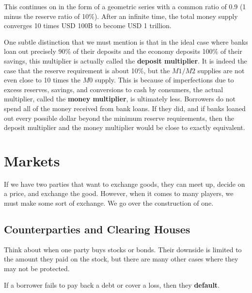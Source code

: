 \documentclass{article}
\begin{document}
      This continues on in the form of a geometric series with a common ratio of 0.9 (1 minus the reserve ratio of 10\%). After an infinite time, the total money supply converges 10 times USD 100B to become USD 1 trillion.

      One subtle distinction that we must mention is that in the ideal case where banks loan out precisely 90\% of their deposits and the economy deposits 100\% of their savings, this multiplier is actually called the \textbf{deposit multiplier}. It is indeed the case that the reserve requirement is about 10\%, but the $M1/M2$ supplies are not even close to 10 times the $M0$ supply. This is because of imperfections due to excess reserves, savings, and conversions to cash by consumers, the actual multiplier, called the \textbf{money multiplier}, is ultimately less. Borrowers do not spend all of the money received from bank loans. If they did, and if banks loaned out every possible dollar beyond the minimum reserve requirements, then the deposit multiplier and the money multiplier would be close to exactly equivalent.

\section{Markets}

  If we have two parties that want to exchange goods, they can meet up, decide on a price, and exchange the good. However, when it comes to many players, we must make some sort of exchange. We go over the construction of one. 

  \subsection{Counterparties and Clearing Houses}

    Think about when one party buys stocks or bonds. Their downside is limited to the amount they paid on the stock, but there are many other cases where they may not be protected. 

    \begin{definition}[Default]
      If a borrower fails to pay back a debt or cover a loss, then they \textbf{default}. 
    \end{definition}
\end{document}
